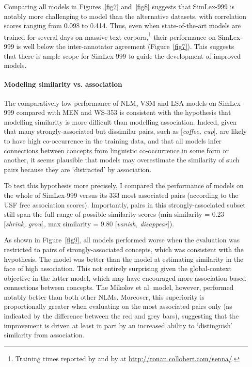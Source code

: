 Comparing all models in Figures~\ref{fig7} and~\ref{fig8} suggests that SimLex-999 is notably more challenging to model than the alternative datasets, with correlation scores ranging from 0.098 to 0.414. Thus, even when state-of-the-art models are trained for several days on massive text corpora,\footnote{Training times reported by \cite{huang2012improving} and by \cite{collobert2008unified} at \url{http://ronan.collobert.com/senna/}.} their performance on SimLex-999 is well below the inter-annotator agreement (Figure~\ref{fig7}). This suggests that there is ample scope for SimLex-999 to guide the development of improved models. 

\paragraph{\bf Modeling similarity vs. association}

The comparatively low performance of NLM, VSM and LSA models on SimLex-999 compared with MEN and WS-353 is consistent with the hypothesis that modelling similarity is more difficult than modelling association. Indeed, given that many strongly-associated but dissimilar pairs, such as [\emph{coffee, cup}], are likely to have high co-occurrence in the training data, and that all models infer connections between concepts from linguistic co-occurrence in some form or another, it seems plausible that models may overestimate the similarity of such pairs because they are `distracted' by association.

To test this hypothesis more precisely, I compared the performance of models on the whole of SimLex-999 versus its 333 most associated pairs (according to the USF free association scores). Importantly, pairs in this strongly-associated subset still span the full range of possible similarity scores (min similarity = 0.23 [\emph{shrink, grow}], max similarity = 9.80 [\emph{vanish, disappear}]).     

As shown in Figure~\ref{fig9}, all models performed worse when the evaluation was restricted to pairs of strongly-associated concepts, which was consistent with the hypothesis. The \cite{collobert2008unified} model was better than the \cite{huang2012improving} model at estimating similarity in the face of high association. This not entirely surprising given the global-context objective in the latter model, which may have encouraged more association-based connections between concepts. The Mikolov et al. model, however, performed notably better than both other NLMs. Moreover, this superiority is proportionally greater when evaluating on the most associated pairs only (as indicated by the difference between the red and grey bars), suggesting that the improvement is driven at least in part by an increased ability to `distinguish' similarity from association. 

